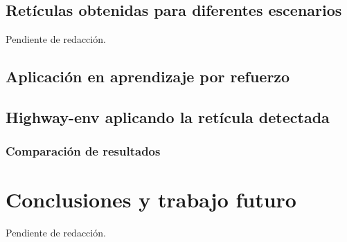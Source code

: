 \documentclass[10pt,letterpaper,final]{report}
\newlength{\spacing}
\newcommand{\nspace}[1]{\setlength{\baselineskip}{#1\spacing}}
\newenvironment{linespacing}[1]{\nspace{#1}}{}
\begin{document}
\begin{linespacing}{1.5}
\section{Retículas obtenidas para diferentes escenarios}
Pendiente de redacción.

\section{Aplicación en aprendizaje por refuerzo}


\section{Highway-env aplicando la retícula detectada}


\subsection{Comparación de resultados}

\clearpage
\chapter{Conclusiones y trabajo futuro}
Pendiente de redacción.

\end{linespacing}
\clearpage


\end{document}
